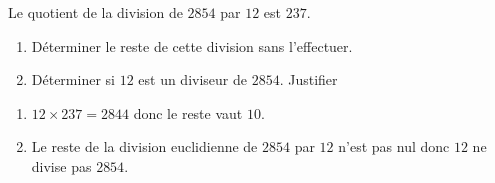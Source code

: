 \begin{exercice*}
    Le quotient de la division de $\num{2 854}$ par $12$ est $237$.
    \begin{enumerate}
        \item Déterminer le reste de cette division sans l'effectuer.
        \item Déterminer si $12$ est un diviseur de $\num{2854}$. Justifier
    \end{enumerate}

    
\end{exercice*}
\begin{corrige}
    \begin{enumerate}
        \item $12\times 237 = \num{2844}$ donc le reste vaut $10$.
        \item Le reste de la division euclidienne de $\num{2 854}$ par $12$ n'est pas nul donc $12$ ne divise pas $\num{2 854}$.
    \end{enumerate}
\end{corrige}

